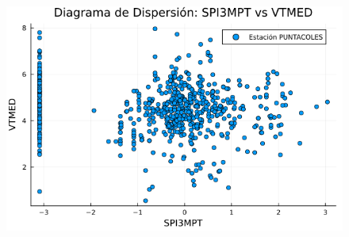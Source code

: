 \begin{figure}[htbp]
\begin{minipage}{0.32\textwidth}
    \includegraphics[width=\linewidth]{Capitulos/Scaterplot/PUNTACOLES_SPI3MPT_vs_VTMED.png}
\end{minipage}

\vspace{0.5cm}  %


\end{figure}
